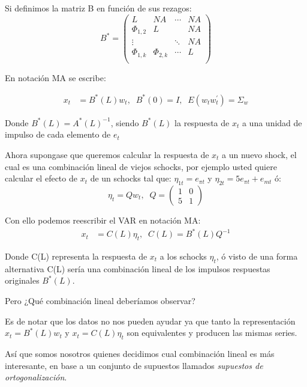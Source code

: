 \documentclass[
]{book}
\begin{document}
Si definimos la matriz B en función de sus rezagos:
\begin{equation}
B^{*}=\left( \begin{array}{cccc}
L      & NA  & \cdots & NA\\
\Phi_{1,2} & L   &        & NA\\
\vdots &     & \ddots & NA\\
\Phi_{1,k} & \Phi_{2,k}   & \cdots & L\\
\end{array}
\right)
\end{equation}

En notación MA se escribe:

\begin{align}
x_{t}&=B^{*}(L)w_{t},\;\;B^{*}(0)=I,\;\;E(w_{t}w_{t}^{'})=\Sigma_w 
\end{align}

Donde \(B^{*}(L)=A^{*}(L)^{-1}\), siendo \(B^{*}(L)\) la respuesta de \(x_{t}\) a una unidad de impulso de cada elemento de \(e_{t}\)

Ahora supongase que queremos calcular la respuesta de \(x_{t}\) a un nuevo shock, el cual es una combinación lineal de viejos schocks, por ejemplo usted quiere calcular el efecto de \(x_{t}\) de un schocks tal que: \(\eta_{1t}=e_{\pi t}\) y \(\eta_{2t}=5e_{\pi t}+e_{mt}\) ó:
\begin{equation}
\eta_{t}=Qw_t,\;\;Q=\left( \begin{array}{cc}
    1 & 0\\
    5 & 1
\end{array}
\right) \nonumber
\end{equation}

Con ello podemos reescribir el VAR en notación MA:
\begin{align}
x_{t}&=C(L)\eta_{t},\;\;C(L)=B^{*}(L)Q^{-1}
\end{align}

Donde C(L) representa la respuesta de \(x_{t}\) a los schocks \(\eta_{t}\), ó visto de una forma alternativa C(L) sería una combinación lineal de los impulsos respuestas originales \(B^{*}(L)\).

Pero ¿Qué combinación lineal deberíamos observar?

Es de notar que los datos no nos pueden ayudar ya que tanto la representación \(x_{t}=B^{*}(L)w_{t}\) y \(x_{t}=C(L)\eta_{t}\) son equivalentes y producen las mismas series.

Así que somos nosotros quienes decidimos cual combinación lineal es más interesante, en base a un conjunto de supuestos llamados \emph{supuestos de ortogonalización}.
\end{document}
